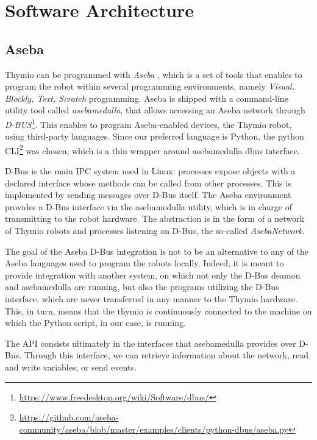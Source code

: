 \section{Software Architecture}

\subsection{Aseba}

Thymio can be programmed with \emph{Aseba} \cite{retornaz2013seamless}, which is a set of tools that enables to program the robot within several programming environments, namely \emph{Visual, Blockly, Text, Scratch} programming. Aseba is shipped with a command-line utility tool called \emph{asebamedulla}, that allows accessing an Aseba network through \emph{D-BUS}\footnote{\url{https://www.freedesktop.org/wiki/Software/dbus/}}. This enables to program Aseba-enabled devices, the Thymio robot, using third-party languages. Since our preferred language is Python, the python CLI\footnote{\url{https://github.com/aseba-community/aseba/blob/master/examples/clients/python-dbus/aseba.py}} was chosen, which is a thin wrapper around asebamedulla dbus interface.

D-Bus is the main IPC system used in Linux: processes expose objects with a declared interface whose methods can be called from other processes. This is implemented by sending messages over D-Bus itself. The Aseba environment provides a D-Bus interface via the asebamedulla utility, which is in charge of transmitting to the robot hardware. The abstraction is in the form of a network of Thymio robots and processes listening on D-Bus, the so-called \emph{AsebaNetwork}.

The goal of the Aseba D-Bus integration is not to be an alternative to any of the Aseba languages used to program the robots locally. Indeed, it is meant to provide integration with another system, on which not only the D-Bus deamon and asebamedulla are running, but also the programs utilizing the D-Bus interface, which are never transferred in any manner to the Thymio hardware. This, in turn, means that the thymio is continuously connected to the machine on which the Python script, in our case, is running.

The API consists ultimately in the interfaces that asebamedulla provides over D-Bus. Through this interface, we can retrieve information about the network, read and write variables, or send events.

